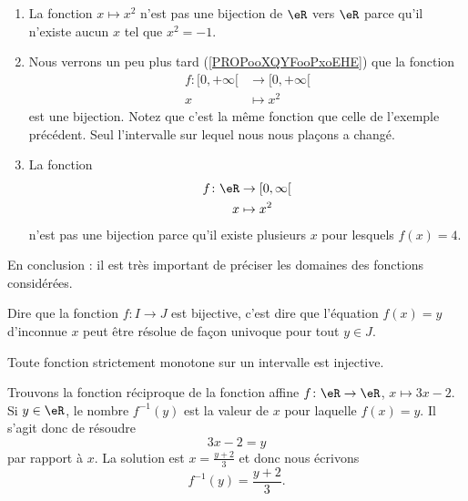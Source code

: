 \begin{example}     \label{EXooCWYHooLEciVj}
	\begin{enumerate}
		\item
		      La fonction \( x\mapsto x^2\) n'est pas une bijection de \( \eR\) vers \( \eR\) parce qu'il n'existe aucun \( x\) tel que \( x^2=-1\).
		\item
		      Nous verrons un peu plus tard (\ref{PROPooXQYFooPxoEHE}) que la fonction
		      \begin{equation}
			      \begin{aligned}
				      f\colon \mathopen[ 0 , +\infty [ & \to \mathopen[ 0 , +\infty [ \\
				      x                                & \mapsto x^2
			      \end{aligned}
		      \end{equation}
		      est une bijection. Notez que c'est la même fonction que celle de l'exemple précédent. Seul l'intervalle sur lequel nous nous plaçons a changé.
		\item
		      La fonction
		      \begin{equation}
			      \begin{aligned}
				      f\colon \eR & \to \mathopen[ 0 , \infty \mathclose[ \\
				      x           & \mapsto x^2
			      \end{aligned}
		      \end{equation}
		      n'est pas une bijection parce qu'il existe plusieurs \( x\) pour lesquels \( f(x)=4\).
	\end{enumerate}
	En conclusion : il est très important de préciser les domaines des fonctions considérées.
\end{example}

\begin{remark}
	Dire que la fonction \( f\colon I\to J\) est bijective, c'est dire que l'équation \( f(x)=y\) d'inconnue \( x\) peut être résolue de façon univoque pour tout \( y\in J\).
\end{remark}

\begin{lemma}       \label{LEMooSDMMooYYDDLs}
	Toute fonction strictement monotone sur un intervalle est injective.
\end{lemma}

\begin{example}
	Trouvons la fonction réciproque de la fonction affine \( f\colon \eR\to \eR\), \( x\mapsto 3x-2\). Si \( y\in \eR\), le nombre \( f^{-1}(y)\) est la valeur de \( x\) pour laquelle \( f(x)=y\). Il s'agit donc de résoudre
	\begin{equation}
		3x-2=y
	\end{equation}
	par rapport à \( x\). La solution est \( x=\frac{ y+2 }{ 3 }\) et donc nous écrivons
	\begin{equation}
		f^{-1}(y)=\frac{ y+2 }{ 3 }.
	\end{equation}
\end{example}

